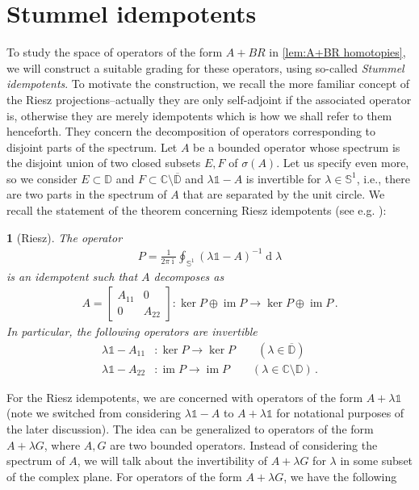 \documentclass[a4paper,10pt]{article}
\numberwithin{equation}{section}
\theoremstyle{plain}
\newtheorem{thm}{\protect\theoremname}[section]
\theoremstyle{plain}
\theoremstyle{plain}
\theoremstyle{plain}
\theoremstyle{plain}
\theoremstyle{remark}
\theoremstyle{definition}
\theoremstyle{plain}
\providecommand{\theoremname}{Theorem}
\newcommand{\ii}{\operatorname{i}}
\newcommand{\bS}{\mathbb{S}}
\newcommand{\CC}{\mathbb{C}}
\newcommand{\dif}{\operatorname{d}}
\newcommand{\Id}{\mathds{1}}
\newcommand{\im}{\operatorname{im}}
\newcommand{\eq}[1]{\begin{align*}#1\end{align*}}
\newcommand{\DD}{\mathbb{D}}
\begin{document}
				
		
		
		
		
		
		
		
		\section{Stummel idempotents}
		To study the space of operators of the form $A+BR$ in \cref{lem:A+BR homotopies}, we will construct a suitable grading for these operators, using so-called \emph{Stummel idempotents}. To motivate the construction, we recall the more familiar concept of the Riesz projections--actually they are only self-adjoint if the associated operator is, otherwise they are merely idempotents which is how we shall refer to them henceforth. They concern the decomposition of operators corresponding to disjoint parts of the spectrum. Let $A$ be a bounded operator whose spectrum is the disjoint union of two closed subsets $E,F$ of $\sigma(A)$. Let us specify even more, so we consider $E\subset \DD$ and $F\subset \CC\setminus\overline{\DD}$ and $\lambda\Id-A$ is invertible for $\lambda \in \bS^1$, i.e., there are two parts in the spectrum of $A$ that are separated by the unit circle. We recall the statement of the theorem concerning Riesz idempotents  (see e.g. \cite[Chapter I]{gohberg1988block}):
		\begin{thm}[Riesz]
			The operator \eq{P=\frac{1}{2\pi \ii} \oint_{\bS^1} (\lambda\Id-A)^{-1}\dif{\lambda}} is an idempotent such that $A$ decomposes as \eq{A=\begin{bmatrix}A_{11} & 0 \\ 0 & A_{22}\end{bmatrix}:\ker P\oplus \im P \to \ker P \oplus \im P\,.} In particular, the following operators are invertible \eq{\lambda \Id-A_{11}& :\ker P\to \ker P \qquad (\lambda\in \overline{\DD}) \\ \lambda\Id-A_{22}& :\im P\to \im P \qquad (\lambda\in \CC\setminus \DD) \,.}
		\end{thm}
		
		For the Riesz idempotents, we are concerned with operators of the form $A+\lambda\Id$ (note we switched from considering $\lambda\Id-A$ to $A+\lambda\Id$ for notational purposes of the later discussion). The idea can be generalized to operators of the form $A+\lambda G$, where $A,G$ are two bounded operators. Instead of considering the spectrum of $A$, we will talk about the invertibility of $A+\lambda G$ for $\lambda$ in some subset of the complex plane. For operators of the form $A+\lambda G$, we have the following 
		
\end{document}
